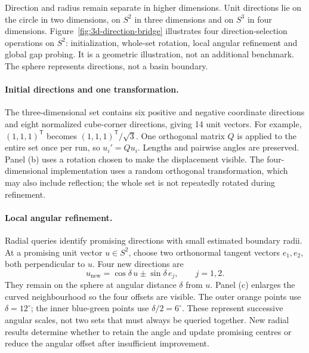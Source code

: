 \begin{bluerevision}
Direction and radius remain separate in higher dimensions. Unit directions lie on the circle in two dimensions, on $S^2$ in three dimensions and on $S^3$ in four dimensions. Figure~\ref{fig:3d-direction-bridge} illustrates four direction-selection operations on $S^2$: initialization, whole-set rotation, local angular refinement and global gap probing. It is a geometric illustration, not an additional benchmark. The sphere represents directions, not a basin boundary.

\paragraph{Initial directions and one transformation.}
The three-dimensional set contains six positive and negative coordinate directions and eight normalized cube-corner directions, giving 14 unit vectors. For example, $(1,1,1)^{\mathsf T}$ becomes $(1,1,1)^{\mathsf T}/\sqrt{3}$. One orthogonal matrix $Q$ is applied to the entire set once per run, so $u_i'=Qu_i$. Lengths and pairwise angles are preserved. Panel (b) uses a rotation chosen to make the displacement visible. The four-dimensional implementation uses a random orthogonal transformation, which may also include reflection; the whole set is not repeatedly rotated during refinement.

\paragraph{Local angular refinement.}
Radial queries identify promising directions with small estimated boundary radii. At a promising unit vector $u\in S^2$, choose two orthonormal tangent vectors $e_1,e_2$, both perpendicular to $u$. Four new directions are
\[
 u_{\mathrm{new}}=\cos\delta\,u\pm\sin\delta\,e_j,
 \qquad j=1,2.
\]
They remain on the sphere at angular distance $\delta$ from $u$. Panel (c) enlarges the curved neighbourhood so the four offsets are visible. The outer orange points use $\delta=12^\circ$; the inner blue-green points use $\delta/2=6^\circ$. These represent successive angular scales, not two sets that must always be queried together. New radial results determine whether to retain the angle and update promising centres or reduce the angular offset after insufficient improvement.


\end{bluerevision}
